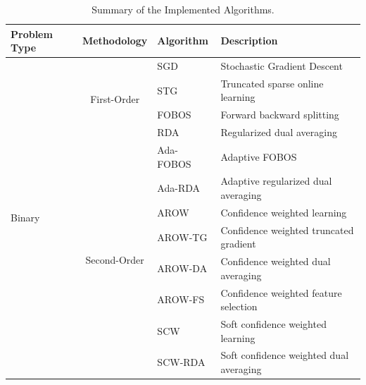 \documentclass[11pt,a4paper]{article}
\begin{document}
\begin{table}[!htpb]
    \caption{Summary of the Implemented Algorithms.}
    \label{tab:summary-algorithms}
    \begin{small}
        \renewcommand{\arraystretch}{1.3}
        \begin{tabular}{l||c|l|l}
            \hline
            Problem Type   &  Methodology & Algorithm & Description \\\hline \hline
            \multirow{12}{*}{Binary} &\multirow{4}{*}{\footnotesize First-Order}
            & SGD & {\footnotesize Stochastic Gradient Descent~\cite{rosenblatt1958perceptron}} \\\cline{3-4}
            & & STG & {\footnotesize Truncated sparse online learning~\cite{langford2009sparse}} \\\cline{3-4}
            & &FOBOS & {\footnotesize Forward backward splitting~\cite{duchi2009efficient}}\\\cline{3-4}
            & &RDA & {\scriptsize Regularized dual averaging~\cite{xiao2010dual}} \\\cline{2-4}
            &\multirow{8}{*}{\footnotesize Second-Order}
            &Ada-FOBOS & {\footnotesize Adaptive FOBOS~\cite{duchi2011adaptive}}\\\cline{3-4}
            &Classification  & Ada-RDA &Adaptive regularized dual averaging~\cite{duchi2011adaptive}\\\cline{3-4}
            & &AROW & Confidence weighted learning~\cite{crammer2009adaptive}\\\cline{3-4}
            & &AROW-TG & Confidence weighted truncated gradient\\\cline{3-4}
            & &AROW-DA & Confidence weighted dual averaging\\\cline{3-4}
            & &AROW-FS & Confidence weighted feature selection\\\cline{3-4}
            & &SCW & Soft confidence weighted learning~\cite{wang2012exact}\\\cline{3-4}
            & &SCW-RDA & Soft confidence weighted dual averaging\\\cline{3-4}
            \hline
        \end{tabular}
    \end{small}
    \renewcommand{\arraystretch}{1}
\end{table}
\end{document}
